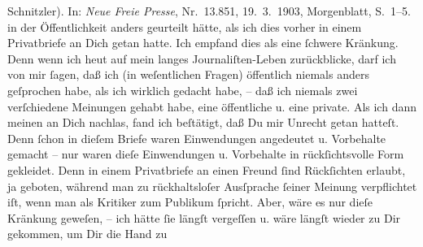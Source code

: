 \begin{ledgroupsized}[t]{13cm}
{{{{                        Schnitzler)}. In: \emph{Neue Freie
                        Presse}, Nr. 13.851, 19. 3. 1903,
                     Morgenblatt, S. 1–5.}}}\label{K_L03478-4h}{ }\strikeout{\textcolor{gray}{×}} in
               der Öffentlichkeit anders
               geurteilt hätte, als ich dies vorher in einem Privatbriefe an Dich getan hatte. Ich
               empfand dies als eine ſchwere Kränkung. Denn wenn ich heut auf mein langes
               Journaliſten-Leben zurückblicke, darf ich von mir ſagen, daß ich (in weſentlichen
               Fragen) öffentlich niemals anders geſprochen habe, als ich wirklich gedacht habe, –
               daß ich niemals zwei verſchiedene Meinungen gehabt habe, eine öffentliche {\pb}u. eine private. Als ich dann meinen \label{K_L03478-5v}\label{K_L03478-5h} an Dich
               nachlas, fand ich beſtätigt, daß Du mir Unrecht getan hatteſt. Denn ſchon in dieſem
               Briefe waren Einwendungen angedeutet u. Vorbehalte gemacht – nur waren dieſe
               Einwendungen u. Vorbehalte in rückſichtsvolle Form gekleidet. Denn in einem
               Privatbriefe an einen Freund ſind Rückſichten erlaubt, ja geboten, während man zu
               rückhaltsloſer Ausſprache ſeiner Meinung verpflichtet iſt, wenn man als Kritiker zum
               Publikum ſpricht.\pend
           \pstart
           Aber, wäre es nur {\pb}dieſe Kränkung geweſen, – ich
               hätte ſie längſt vergeſſen u. wäre längſt wieder zu Dir gekommen, um Dir die Hand zu

\end{ledgroupsized}

